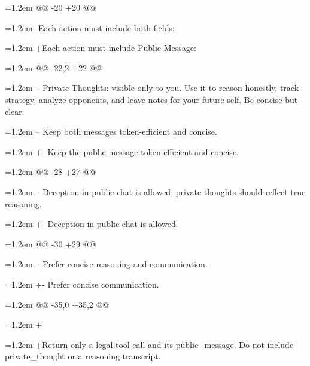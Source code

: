 \noindent\hangindent=1.2em @@ -20 +20 @@\par
\noindent\hangindent=1.2em -Each action must include both fields:\par
\noindent\hangindent=1.2em +Each action must include Public Message:\par
\noindent\hangindent=1.2em @@ -22,2 +22 @@\par
\noindent\hangindent=1.2em -- Private Thoughts: visible only to you. Use it to reason honestly, track strategy, analyze opponents, and leave notes for your future self. Be concise but clear.\par
\noindent\hangindent=1.2em -- Keep both messages token-efficient and concise.\par
\noindent\hangindent=1.2em +- Keep the public message token-efficient and concise.\par
\noindent\hangindent=1.2em @@ -28 +27 @@\par
\noindent\hangindent=1.2em -- Deception in public chat is allowed; private thoughts should reflect true reasoning.\par
\noindent\hangindent=1.2em +- Deception in public chat is allowed.\par
\noindent\hangindent=1.2em @@ -30 +29 @@\par
\noindent\hangindent=1.2em -- Prefer concise reasoning and communication.\par
\noindent\hangindent=1.2em +- Prefer concise communication.\par
\noindent\hangindent=1.2em @@ -35,0 +35,2 @@\par
\noindent\hangindent=1.2em +\par
\noindent\hangindent=1.2em +Return only a legal tool call and its public\_message. Do not include private\_thought or a reasoning transcript.\par
